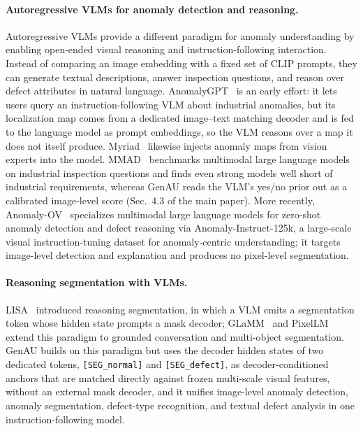\paragraph{Autoregressive VLMs for anomaly detection and reasoning.}
Autoregressive VLMs provide a different paradigm for anomaly understanding by enabling open-ended visual reasoning and instruction-following interaction. Instead of comparing an image embedding with a fixed set of CLIP prompts, they can generate textual descriptions, answer inspection questions, and reason over defect attributes in natural language. AnomalyGPT~\cite{gu2023anomalygptdetectingindustrialanomalies} is an early effort: it lets users query an instruction-following VLM about industrial anomalies, but its localization map comes from a dedicated image--text matching decoder and is fed to the language model as prompt embeddings, so the VLM reasons over a map it does not itself produce. Myriad~\cite{li2023myriad} likewise injects anomaly maps from vision experts into the model. MMAD~\cite{jiang2025mmad} benchmarks multimodal large language models on industrial inspection questions and finds even strong models well short of industrial requirements, whereas GenAU reads the VLM's yes/no prior out as a calibrated image-level score (Sec.~4.3 of the main paper). More recently, Anomaly-OV~\cite{xu2025towards} specializes multimodal large language models for zero-shot anomaly detection and defect reasoning via Anomaly-Instruct-125k, a large-scale visual instruction-tuning dataset for anomaly-centric understanding; it targets image-level detection and explanation and produces no pixel-level segmentation.

\paragraph{Reasoning segmentation with VLMs.}
LISA~\cite{lai2024lisareasoningsegmentationlarge} introduced reasoning segmentation, in which a VLM emits a segmentation token whose hidden state prompts a mask decoder; GLaMM~\cite{rasheed2024glamm} and PixelLM~\cite{ren2024pixellm} extend this paradigm to grounded conversation and multi-object segmentation. GenAU builds on this paradigm but uses the decoder hidden states of two dedicated tokens, \texttt{[SEG\_normal]} and \texttt{[SEG\_defect]}, as decoder-conditioned anchors that are matched directly against frozen multi-scale visual features, without an external mask decoder, and it unifies image-level anomaly detection, anomaly segmentation, defect-type recognition, and textual defect analysis in one instruction-following model.

